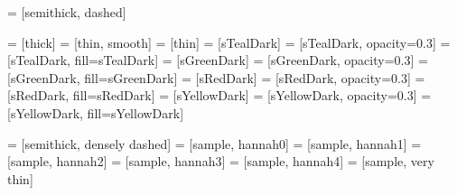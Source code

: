 
 = [semithick, dashed]

 = [thick]
 = [thin, smooth]
 = [thin]
 = [sTealDark]
 = [sTealDark, opacity=0.3]
 = [sTealDark, fill=sTealDark]
 = [sGreenDark]
 = [sGreenDark, opacity=0.3]
 = [sGreenDark, fill=sGreenDark]
 = [sRedDark]
 = [sRedDark, opacity=0.3]
 = [sRedDark, fill=sRedDark]
 = [sYellowDark]
 = [sYellowDark, opacity=0.3]
 = [sYellowDark, fill=sYellowDark]

 = [semithick, densely dashed]
 = [sample, hannah0]
 = [sample, hannah1]
 = [sample, hannah2]
 = [sample, hannah3]
 = [sample, hannah4]
 = [sample, very thin]


